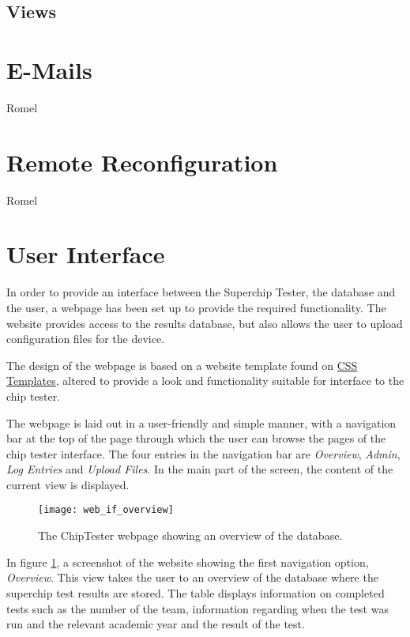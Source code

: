 \subsection{Views}

\section{E-Mails}
Romel

\section{Remote Reconfiguration}
Romel

\section{User Interface}

In order to provide an interface between the Superchip Tester, the database and the user, a webpage has been set up to provide the required functionality. The website provides access to the results database, but also allows the user to upload configuration files for the device.

The design of the webpage is based on a website template found on \href{http://www.freecsstemplates.org/}{CSS Templates}, altered to provide a look and functionality suitable for interface to the chip tester.

The webpage is laid out in a user-friendly and simple manner, with a navigation bar at the top of the page through which the user can browse the pages of the chip tester interface. The four entries in the navigation bar are \textit{Overview}, \textit{Admin}, \textit{Log Entries} and \textit{Upload Files}. In the main part of the screen, the content of the current view is displayed.

\begin{figure}[ht]
 \centering
 \texttt{[image: web\_if\_overview]}
 \caption{The ChipTester webpage showing an overview of the database.}
 \label{fig:web_if_overview}
\end{figure}

In figure \ref{fig:web_if_overview}, a screenshot of the website showing the first navigation option, \textit{Overview}. This view takes the user to an overview of the database where the superchip test results are stored. The table displays information on completed tests such as the number of the team, information regarding when the test was run and the relevant academic year and the result of the test.

